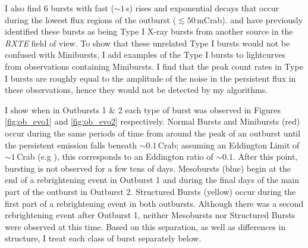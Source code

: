 \par I also find 6 bursts with fast ($\sim1$\,s) rises and exponential decays that occur during the lowest flux regions of the outburst ($\lesssim50$\,mCrab).  \citet{Strohmayer_BPFieldTypeI} and \citet{Galloway_TypeI} have previously identified these bursts as being Type I X-ray bursts from another source in the \indexrxte\textit{RXTE} field of view.  To show that these unrelated Type I bursts would not be confused with Minibursts, I add examples of the Type I bursts to lightcurves from observations containing Minibursts.  I find that the peak count rates in Type I bursts are roughly equal to the amplitude of the noise in the persistent flux in these observations, hence they would not be detected by my algorithms.
\par I show when in Outbursts 1 \& 2 each type of burst was observed in Figures \ref{fig:ob_evo1} and \ref{fig:ob_evo2} respectively.  Normal Bursts and Minibursts (red) occur during the same periods of time from around the peak of an outburst until the persistent emission falls beneath $\sim0.1$\,Crab; assuming an Eddington Limit of $\sim1$\,Crab (e.g \citealp{Sazonov_BPGranat}), this corresponds to an Eddington ratio of $\sim0.1$.  After this point, bursting is not observed for a few tens of days.  Mesobursts (blue) begin at the end of a rebrightening event in Outburst 1 and during the final days of the main part of the outburst in Outburst 2.  Structured Bursts (yellow) occur during the first part of a rebrightening event in both outbursts.  Although there was a second rebrightening event after Outburst 1, neither Mesobursts nor Structured Bursts were observed at this time.  Based on this separation, as well as differences in structure, I treat each class of burst separately below.

